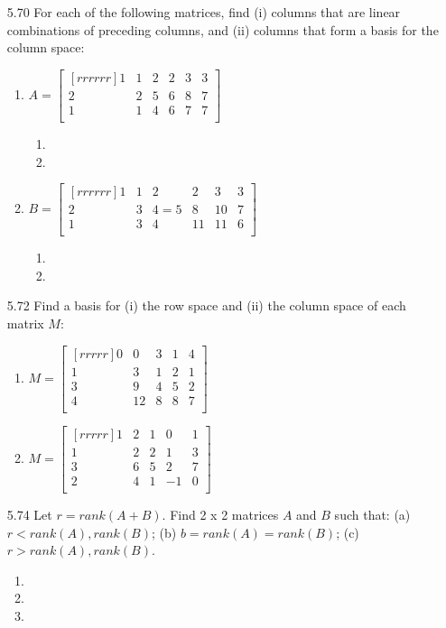 \documentclass[12pt]{article}
\begin{document}
\begin{enumerate}
\item[5.70] For each of the following matrices, find (i) columns that are linear combinations of preceding columns, and (ii) columns that form a basis for the column space:
	\begin{enumerate}
	\item $A=\begin{bmatrix}[rrrrrr]1&1&2&2&3&3\\2&2&5&6&8&7\\1&1&4&6&7&7\\\end{bmatrix}$
		\begin{enumerate}
		\item
		\item		
		\end{enumerate}			
	\item $B=\begin{bmatrix}[rrrrrr]1&1&2&2&3&3\\2&3&4=5&8&10&7\\1&3&4&11&11&6\\\end{bmatrix}$
		\begin{enumerate}
		\item
		\item
		\end{enumerate}			
	\end{enumerate}

\item[5.72] Find a basis for (i) the row space and (ii) the column space of each matrix $M$:
	\begin{enumerate}
	\item $M=\begin{bmatrix}[rrrrr]0&0&3&1&4\\1&3&1&2&1\\3&9&4&5&2\\4&12&8&8&7\\\end{bmatrix}$
	\item $M=\begin{bmatrix}[rrrrr]1&2&1&0&1\\1&2&2&1&3\\3&6&5&2&7\\2&4&1&-1&0\\\end{bmatrix}$
	\end{enumerate}

\item[5.74] Let $r=rank(A+B)$. Find 2 x 2 matrices $A$ and $B$ such that: (a) $r<rank(A),rank(B)$; (b) $b=rank(A)=rank(B)$; (c) $r>rank(A),rank(B)$.
	\begin{enumerate}
	\item
	\item
	\item
	\end{enumerate}


\end{enumerate}
\end{document}
